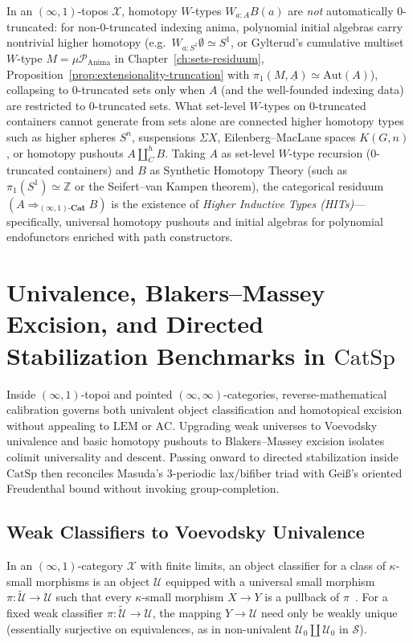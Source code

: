 In an $(\infty, 1)$-topos $\mathcal{X}$, homotopy $W$-types $W_{a:A} B(a)$ are \emph{not} automatically $0$-truncated: for non-$0$-truncated indexing anima, polynomial initial algebras carry nontrivial higher homotopy (e.g.\ $W_{a:S^1} \emptyset \simeq S^1$, or Gylterud's cumulative multiset $W$-type $M = \mu\mathcal{P}_{\mathrm{Anima}}$ in Chapter~\ref{ch:sets-residuum}, Proposition~\ref{prop:extensionality-truncation} with $\pi_1(M, \underline{A}) \simeq \mathrm{Aut}(A)$), collapsing to $0$-truncated sets only when $A$ (and the well-founded indexing data) are restricted to $0$-truncated sets. What set-level $W$-types on $0$-truncated containers cannot generate from sets alone are connected higher homotopy types such as higher spheres $S^n$, suspensions $\Sigma X$, Eilenberg--MacLane spaces $K(G, n)$, or homotopy pushouts $A \amalg^h_C B$. Taking $A$ as set-level $W$-type recursion ($0$-truncated containers) and $B$ as Synthetic Homotopy Theory (such as $\pi_1(S^1) \simeq \mathbb{Z}$ or the Seifert--van Kampen theorem), the categorical residuum $(A \Rightarrow_{(\infty,1)\text{-}\mathbf{Cat}} B)$ is the existence of \emph{Higher Inductive Types (HITs)}---specifically, universal homotopy pushouts and initial algebras for polynomial endofunctors enriched with path constructors.

\section{Univalence, Blakers--Massey Excision, and Directed Stabilization Benchmarks in $\mathrm{CatSp}$}\label{subsec:excision-catsp}

Inside $(\infty, 1)$-topoi and pointed $(\infty, \infty)$-categories, reverse-mathematical calibration governs both univalent object classification and homotopical excision without appealing to $\mathrm{LEM}$ or $\mathrm{AC}$. Upgrading weak universes to Voevodsky univalence and basic homotopy pushouts to Blakers--Massey excision isolates colimit universality and descent. Passing onward to directed stabilization inside $\mathrm{CatSp}$ then reconciles Masuda's 3-periodic lax/bifiber triad with Gei\ss's oriented Freudenthal bound without invoking group-completion.

\subsection{Weak Classifiers to Voevodsky Univalence}

In an $(\infty, 1)$-category $\mathcal{X}$ with finite limits, an object classifier for a class of $\kappa$-small morphisms is an object $\mathcal{U}$ equipped with a universal small morphism $\pi : \widetilde{\mathcal{U}} \to \mathcal{U}$ such that every $\kappa$-small morphism $X \to Y$ is a pullback of $\pi$~\cite[\S 6.1.6]{Lurie09}. For a fixed weak classifier $\pi : \widetilde{\mathcal{U}} \to \mathcal{U}$, the mapping $Y \to \mathcal{U}$ need only be weakly unique (essentially surjective on equivalences, as in non-univalent $\mathcal{U}_0 \amalg \mathcal{U}_0$ in $\mathcal{S}$).

